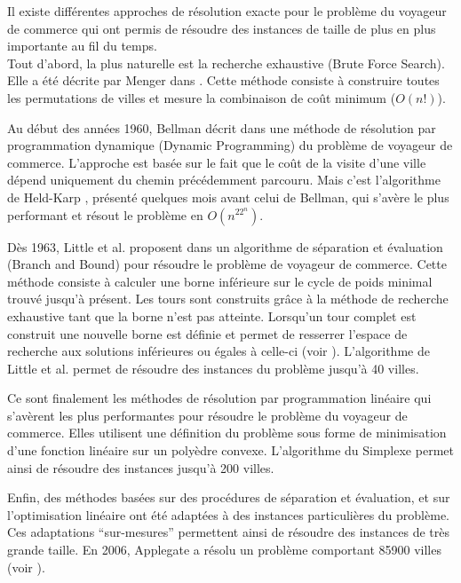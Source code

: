Il existe différentes approches de résolution exacte pour le problème du voyageur de commerce qui ont permis de résoudre des instances de taille de plus en plus importante au fil du temps.\\

Tout d'abord, la plus naturelle est la recherche exhaustive (Brute Force Search). Elle a été décrite par Menger dans \cite{Menger1928}. Cette méthode consiste à construire toutes les permutations de villes et mesure la combinaison de coût minimum ($O(n!)$).

Au début des années 1960, Bellman décrit dans \cite{Bellman1962} une méthode de résolution par programmation dynamique (Dynamic Programming) du problème de voyageur de commerce. L'approche est basée sur le fait que le coût de la visite d'une ville dépend uniquement du chemin précédemment parcouru. Mais c'est l'algorithme de Held-Karp \cite{Held1961}, présenté quelques mois avant celui de Bellman, qui s'avère le plus performant et résout le problème en $O(n^22^n)$.

Dès 1963, Little et al. proposent dans \cite{Little1963} un algorithme de séparation et évaluation (Branch and Bound) pour résoudre le problème de voyageur de commerce. Cette méthode consiste à calculer une borne inférieure sur le cycle de poids minimal trouvé jusqu'à présent. Les tours sont construits grâce à la méthode de recherche exhaustive tant que la borne n'est pas atteinte. Lorsqu'un tour complet est construit une nouvelle borne est définie et permet de resserrer l'espace de recherche aux solutions inférieures ou égales à celle-ci (voir \cite{Balas1985}). L'algorithme de Little et al. permet de résoudre des instances du problème jusqu'à 40 villes.

Ce sont finalement les méthodes de résolution par programmation linéaire qui s'avèrent les plus performantes pour résoudre le problème du voyageur de commerce. Elles utilisent une définition du problème sous forme de minimisation d'une fonction linéaire sur un polyèdre convexe. L'algorithme du Simplexe \cite{Dantzig63} permet ainsi de résoudre des instances jusqu'à 200 villes.

Enfin, des méthodes basées sur des procédures de séparation et évaluation, et sur l'optimisation linéaire ont été adaptées à des instances particulières du problème. Ces adaptations ``sur-mesures'' permettent ainsi de résoudre des instances de très grande taille. En 2006, Applegate a résolu un problème comportant 85900 villes (voir \cite{Applegate2006}).


